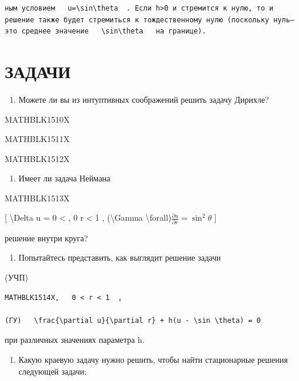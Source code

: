 \documentclass[
]{article}
\providecommand{\tightlist}{%
  \setlength{\itemsep}{0pt}\setlength{\parskip}{0pt}}
\begin{document}
{{{\begin{verbatim}
ным условием   u=\sin\theta  . Если h>0 и стремится к нулю, то и решение также будет стремиться к тождественному нулю (поскольку нуль—это среднее значение   \sin\theta   на границе).
\end{verbatim}

\section{ЗАДАЧИ}\label{ux437ux430ux434ux430ux447ux438-12}

\begin{enumerate}
\def\labelenumi{\arabic{enumi}.}
\tightlist
\item
  Можете ли вы из интуптивных соображений решить задачу Дирихле?
\end{enumerate}

MATHBLK1510X

MATHBLK1511X

MATHBLK1512X

\begin{enumerate}
\def\labelenumi{\arabic{enumi}.}
\setcounter{enumi}{1}
\tightlist
\item
  Имеет ли задача Неймана
\end{enumerate}

MATHBLK1513X

{[} \textbackslash Delta u = 0 \textless{} , 0 r \textless{} 1 ,
(\textbackslash Gamma
\textbackslash forall)\(\frac{\partial u}{\partial r} = \sin^2 \theta\)
{]}

решение внутри круга?

\begin{enumerate}
\def\labelenumi{\arabic{enumi}.}
\setcounter{enumi}{2}
\tightlist
\item
  Попытайтесь представить, как выглядит решение задачи
\end{enumerate}

(УЧП)

\begin{verbatim}
MATHBLK1514X,   0 < r < 1  ,

(ГУ)   \frac{\partial u}{\partial r} + h(u - \sin \theta) = 0 
\end{verbatim}

при различных значениях параметра h.

\begin{enumerate}
\def\labelenumi{\arabic{enumi}.}
\setcounter{enumi}{3}
\tightlist
\item
  Какую краевую задачу нужно решить, чтобы найти стационарные решения
  следующей задачи:
\end{enumerate}

}}}
\end{document}
